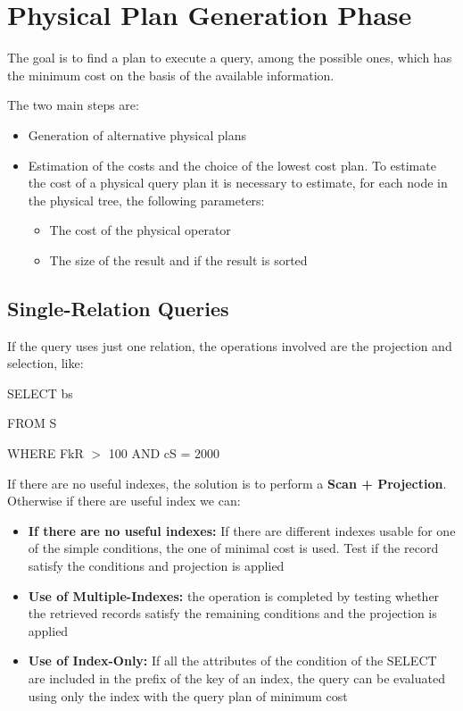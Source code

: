 \section{Physical Plan Generation Phase}
The goal is to find a plan to execute a query, among the possible ones, which has the minimum cost on the basis of the available information.

The two main steps are:
\begin{itemize}
    \item Generation of alternative physical plans
    \item Estimation of the costs and the choice of the lowest cost plan. To estimate the cost of a physical query plan it is necessary to estimate, for each node in the physical tree, the following parameters:
    \begin{itemize}
        \item The cost of the physical operator
        \item The size of the result and if the result is sorted
    \end{itemize}
\end{itemize}

\subsection{Single-Relation Queries}
If the query uses just one relation, the operations involved are the projection and selection, like:

SELECT bs

FROM S

WHERE FkR $>$ 100 AND cS = 2000

If there are no useful indexes, the solution is to perform a \textbf{Scan + Projection}. Otherwise if there are useful index we can:
\begin{itemize}
    \item \textbf{If there are no useful indexes:} If there are different indexes usable for one of the simple conditions, the one of minimal cost is used. Test if the record satisfy the conditions and projection is applied
    \item \textbf{Use of Multiple-Indexes:} the operation is completed by testing whether the retrieved records satisfy the remaining conditions and the projection is applied
    \item \textbf{Use of Index-Only:} If all the attributes of the condition of the SELECT are included in the prefix of the key of an index, the query can be evaluated using only the index with the query plan of minimum cost
\end{itemize}